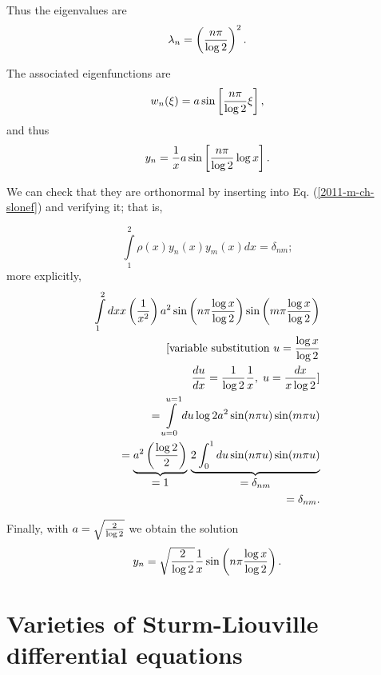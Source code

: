 {Thus the eigenvalues are
\begin{equation}
\lambda_n=
\left({n\pi\over\log2}\right)^2.
\end{equation}

The associated eigenfunctions are
\begin{equation}
w _n(\xi)=a\sin\left[{n\pi\over\log2}
\xi\right],
\end{equation}
and thus
\begin{equation}
y_n={1\over x}a\sin\left[{n\pi\over\log2}
\log x\right].
\end{equation}

We can check that they are orthonormal by inserting into Eq. (\ref{2011-m-ch-slonef})
and verifying it; that is,

\begin{equation}
\int\limits_1^2 \rho (x)y_n(x)
y_m(x)dx=\delta_{nm};
\end{equation}
more explicitly,
\begin{equation}
\begin{split}
\int\limits_1^2 dx x\left({1\over x^2}\right)a^2
   \sin\left(n\pi{\log x\over\log2}\right)\sin\left(m\pi
   {\log x\over\log2}\right)\\
\qquad \textrm{[variable substitution } u={\log x\over\log2}\\
\qquad \quad {du\over dx}=
{1\over\log2}{1\over x},\; u={dx\over x\log2} \textrm{]}\\
\qquad =
\int\limits_{u=0}^{u=1}
  du\log2a^2\sin(n\pi u)\sin(m\pi u)\\
\qquad =
\underbrace{a^2\left({\log2\over2}\right)}_{\mbox{$=1$}}\,
\underbrace{2 \int_0^1du \sin(n\pi u)\sin(m\pi
u)}_{\mbox{$=\delta_{nm}$}}\\
\qquad = \delta_{nm}.
\end{split}
\end{equation}

Finally, with $a=\sqrt{2\over\log 2}$
we obtain the solution
\begin{equation}
y_n=\sqrt{2\over\log2}{1\over x}
\sin\left(n\pi{\log x\over\log2}\right).
\end{equation}

\eexample
}







\section{Varieties of Sturm-Liouville differential equations}

